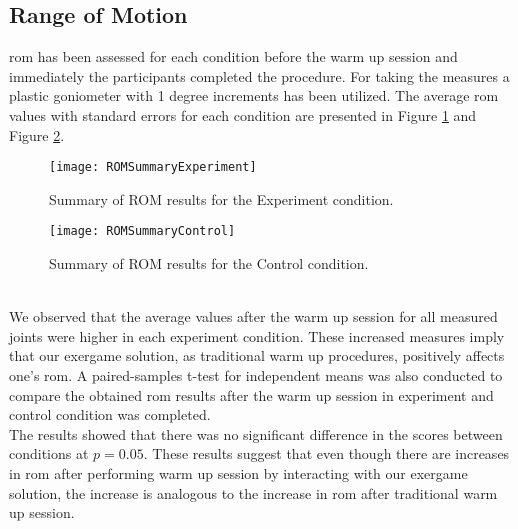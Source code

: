\subsection{Range of Motion}
\gls{rom} has been assessed  for each condition before the warm up session and immediately the participants completed the procedure. For taking the measures a plastic goniometer with 1 degree increments has been utilized. The average \acrshort{rom} values with standard errors for each condition are presented in Figure \ref{fig:romExperiment} and Figure \ref{fig:romControl}. \\
\begin{figure}[h]
    \centering
    \texttt{[image: ROMSummaryExperiment]}
    \caption{Summary of ROM results for the Experiment condition.}
    \label{fig:romExperiment}
\end{figure}
\begin{figure}[h]
    \centering
    \texttt{[image: ROMSummaryControl]}
    \caption{Summary of ROM results for the Control condition.}
    \label{fig:romControl}
\end{figure}\\
We observed that the average values after the warm up session for all measured joints were higher in each experiment condition. These increased measures imply that our exergame solution, as traditional warm up procedures, positively affects one's \acrshort{rom}. A paired-samples t-test for independent means was also conducted to compare the obtained \acrshort{rom} results after the warm up session in experiment and control condition was completed. \\The results showed that there was no significant difference in the scores between conditions at \begin{math}p = 0.05\end{math}. These results suggest that even though there are increases in \acrshort{rom} after performing warm up session by interacting with our exergame solution, the increase is analogous to the increase in \acrshort{rom} after traditional warm up session. 
